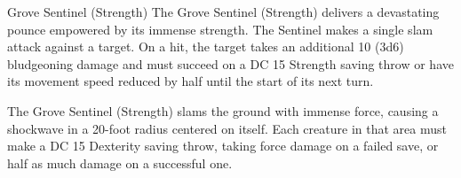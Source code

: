 \begin{DndMonster}[width=0.5\textwidth +0.5em]{Grove Sentinel (Strength)}
    The Grove Sentinel (Strength) delivers a devastating pounce empowered by its immense strength. The Sentinel makes a single slam attack against a target. On a hit, the target takes an additional 10 (3d6) bludgeoning damage and must succeed on a DC 15 Strength saving throw or have its movement speed reduced by half until the start of its next turn.
    
	The Grove Sentinel (Strength) slams the ground with immense force, causing a shockwave in a 20-foot radius centered on itself. Each creature in that area must make a DC 15 Dexterity saving throw, taking  force damage on a failed save, or half as much damage on a successful one.
      
\end{DndMonster}

%
%

